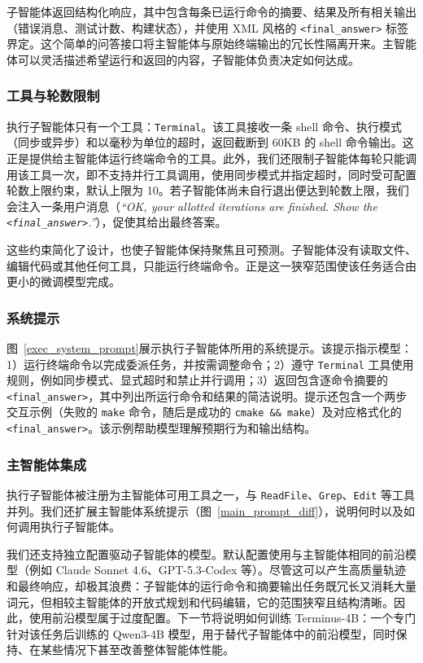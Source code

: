 \documentclass[sigconf,review]{acmart}
\begin{document}
子智能体返回结构化响应，其中包含每条已运行命令的摘要、结果及所有相关输出（错误消息、测试计数、构建状态），并使用 XML 风格的 \texttt{<final\_answer>} 标签界定。这个简单的问答接口将主智能体与原始终端输出的冗长性隔离开来。主智能体可以灵活描述希望运行和返回的内容，子智能体负责决定如何达成。

\subsubsection{工具与轮数限制}
执行子智能体只有一个工具：\texttt{Terminal}。该工具接收一条 shell 命令、执行模式（同步或异步）和以毫秒为单位的超时，返回截断到 60KB 的 shell 命令输出。这正是提供给主智能体运行终端命令的工具。此外，我们还限制子智能体每轮只能调用该工具一次，即不支持并行工具调用，使用同步模式并指定超时，同时受可配置轮数上限约束，默认上限为 10。若子智能体尚未自行退出便达到轮数上限，我们会注入一条用户消息（\textit{“OK, your allotted iterations are finished. Show the \texttt{<final\_answer>}.”}），促使其给出最终答案。

这些约束简化了设计，也使子智能体保持聚焦且可预测。子智能体没有读取文件、编辑代码或其他任何工具，只能运行终端命令。正是这一狭窄范围使该任务适合由更小的微调模型完成。

\subsubsection{系统提示}
图~\ref{exec_system_prompt}展示执行子智能体所用的系统提示。该提示指示模型：1）运行终端命令以完成委派任务，并按需调整命令；2）遵守 \texttt{Terminal} 工具使用规则，例如同步模式、显式超时和禁止并行调用；3）返回包含逐命令摘要的 \texttt{<final\_answer>}，其中列出所运行命令和结果的简洁说明。提示还包含一个两步交互示例（失败的 \texttt{make} 命令，随后是成功的 \texttt{cmake \&\& make}）及对应格式化的 \texttt{<final\_answer>}。该示例帮助模型理解预期行为和输出结构。

\subsubsection{主智能体集成}
执行子智能体被注册为主智能体可用工具之一，与 \texttt{ReadFile}、\texttt{Grep}、\texttt{Edit} 等工具并列。我们还扩展主智能体系统提示（图~\ref{main_prompt_diff}），说明何时以及如何调用执行子智能体。

我们还支持独立配置驱动子智能体的模型。默认配置使用与主智能体相同的前沿模型（例如 Claude Sonnet 4.6、GPT-5.3-Codex 等）。尽管这可以产生高质量轨迹和最终响应，却极其浪费：子智能体的运行命令和摘要输出任务既冗长又消耗大量词元，但相较主智能体的开放式规划和代码编辑，它的范围狭窄且结构清晰。因此，使用前沿模型属于过度配置。下一节将说明如何训练 Terminus-4B：一个专门针对该任务后训练的 Qwen3-4B 模型，用于替代子智能体中的前沿模型，同时保持、在某些情况下甚至改善整体智能体性能。
\end{document}
